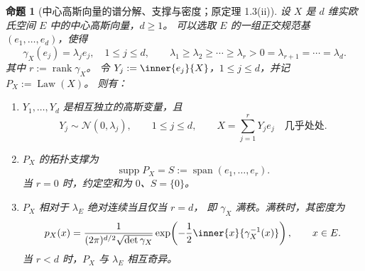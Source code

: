 \documentclass[UTF8,11pt,a4paper,oneside,fontset=fandol]{ctexrep}
\numberwithin{equation}{section}
\theoremstyle{plain}
\newtheorem{proposition}[theorem]{命题}
\theoremstyle{definition}
\theoremstyle{remark}
\DeclareMathOperator{\Law}{Law}
\begin{document}
\begin{samepage}
\begin{proposition}[中心高斯向量的谱分解、支撑与密度；原定理 1.3(ii)]
\label{prop:gaussian-spectral-support-density}
设 $X$ 是 $d$ 维实欧氏空间 $E$ 中的中心高斯向量，$d\ge1$。
可以选取 $E$ 的一组正交规范基 $(e_1,\ldots,e_d)$，使得
\[
  \gamma_X(e_j)=\lambda_je_j,\quad 1\le j\le d,
  \qquad \lambda_1\ge\lambda_2\ge\cdots\ge\lambda_r>0=\lambda_{r+1}=\cdots=\lambda_d.
\]
其中 $r:=\operatorname{rank}\gamma_X$。
令 $Y_j:=\inner{e_j}{X}$，$1\le j\le d$，并记 $P_X:=\Law(X)$。
则有：
\begin{enumerate}[label=(\roman*)]
  \item $Y_1,\ldots,Y_d$ 是相互独立的高斯变量，且
    \[
      Y_j\sim\mathcal{N}(0,\lambda_j),\qquad 1\le j\le d,
      \qquad X=\sum_{j=1}^{r}Y_je_j\quad\text{几乎处处}.
    \]
  \item $P_X$ 的拓扑支撑为
    \[
      \operatorname{supp}P_X=S:=\operatorname{span}(e_1,\ldots,e_r).
    \]
    当 $r=0$ 时，约定空和为 $0$、$S=\{0\}$。
  \item $P_X$ 相对于 $\lambda_E$ 绝对连续当且仅当 $r=d$，
    即 $\gamma_X$ 满秩。满秩时，其密度为
    \begin{equation}
      \label{eq:gaussian-vector-density}
      p_X(x)
      =\frac{1}{(2\pi)^{d/2}\sqrt{\det\gamma_X}}
        \exp\!\left(-\frac12\inner{x}{\gamma_X^{-1}(x)}\right),
      \qquad x\in E.
    \end{equation}
    当 $r<d$ 时，$P_X$ 与 $\lambda_E$ 相互奇异。
\end{enumerate}
\end{proposition}
\end{samepage}
\end{document}
